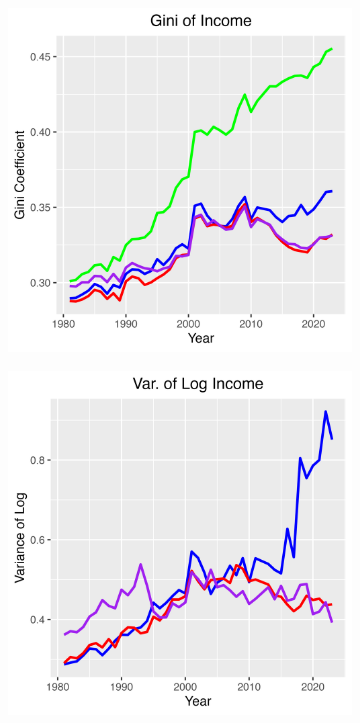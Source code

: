 \documentclass{article}
\begin{document}
\begin{figure}
\begin{subfigure}[t]{0.475\textwidth}
        \includegraphics[width=\textwidth]{Fig_4/Fig_4b_Gini_inc.png}
        \label{fig:Trans_Asset_Gini1}
    \end{subfigure}
    \begin{subfigure}[t]{0.475\textwidth}
        \centering
        \includegraphics[width=\textwidth]{Fig_4/Fig_4c_Var_inc.png}

\end{subfigure}
\end{figure}
\end{document}
